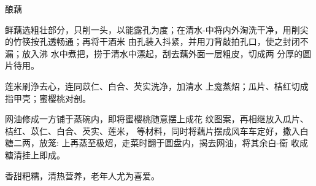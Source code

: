 \begin{recipe}[八宝酿藕]{酿藕}

\ingredients


\cooking

\step 	鲜藕选粗壮部分，只削一头，以能露孔为度；在清水-中将内外淘洗干净，用削尖的竹筷按孔透畅通；再将干酒米 由孔装入抖紧，并用刀背敲拍孔口，使之封闭不漏；放入沸 水中煮把，捞于清水中漂起，刮去藕外面一层粗皮，切成两 分厚的圆片待用。

\step 	莲米刷浄去心，连同苡仁、白合、芡实洗净，加清水 上龛蒸炤；瓜片、桔红切成指甲壳；蜜樱桃对剖。

\step 	网油修成一方铺于蒸碗内，即将蜜樱桃随意摆上成花 纹图案，再相继放入瓜片、桔红、苡仁、白合、芡实、莲米， 等材料，同时将藕片摆成风车车定好，撒入白糖二两，放笼: 上再蒸至极炤，走菜时翻于圆盘内，揭去网油，将其余白-衞 收成糖清挂上即成。

\notes

香甜粑糯，清热营养，老年人尤为喜爱。

\end{recipe}

